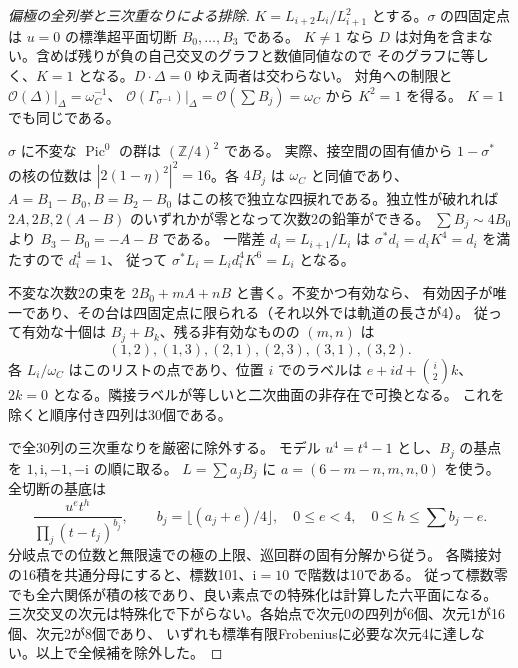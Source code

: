 \begin{proof}[偏極の全列挙と三次重なりによる排除]
$K=L_{i+2}L_i/L_{i+1}^2$ とする。$\sigma$ の四固定点は $u=0$ の標準超平面切断 $B_0,\ldots,B_3$ である。
$K\ne1$ なら $D$ は対角を含まない。含めば残りが負の自己交叉のグラフと数値同値なので
そのグラフに等しく、$K=1$ となる。$D\cdot\Delta=0$ ゆえ両者は交わらない。
対角への制限と $\mathcal O(\Delta)|_\Delta=\omega_C^{-1}$、
$\mathcal O(\Gamma_{\sigma^{-1}})|_\Delta=\mathcal O(\sum B_j)=\omega_C$ から $K^2=1$ を得る。
$K=1$ でも同じである。

$\sigma$ に不変な $\operatorname{Pic}^0$ の群は $(\mathbb Z/4)^2$ である。
実際、接空間の固有値から $1-\sigma^*$ の核の位数は
$|2(1-\eta)^2|^2=16$。各 $4B_j$ は $\omega_C$ と同値であり、
$A=B_1-B_0,B=B_2-B_0$ はこの核で独立な四捩れである。独立性が破れれば
$2A,2B,2(A-B)$ のいずれかが零となって次数2の鉛筆ができる。
$\sum B_j\sim4B_0$ より $B_3-B_0=-A-B$ である。
一階差 $d_i=L_{i+1}/L_i$ は $\sigma^*d_i=d_i K^4=d_i$ を満たすので $d_i^4=1$、
従って $\sigma^*L_i=L_i d_i^4 K^6=L_i$ となる。

不変な次数2の束を $2B_0+mA+nB$ と書く。不変かつ有効なら、
有効因子が唯一であり、その台は四固定点に限られる（それ以外では軌道の長さが4）。
従って有効な十個は $B_j+B_k$、残る非有効なものの $(m,n)$ は
\[
 (1,2),(1,3),(2,1),(2,3),(3,1),(3,2).
\]
各 $L_i/\omega_C$ はこのリストの点であり、位置 $i$ でのラベルは
$e+i d+\binom{i}{2}k$、$2k=0$ となる。隣接ラベルが等しいと二次曲面の非存在で可換となる。
これを除くと順序付き四列は30個である。

で全30列の三次重なりを厳密に除外する。
モデル $u^4=t^4-1$ とし、$B_j$ の基点を $1,\mathrm i,-1,-\mathrm i$ の順に取る。
$L=\sum a_j B_j$ に $a=(6-m-n,m,n,0)$ を使う。全切断の基底は
\[
 \frac{u^e t^h}{\prod_j(t-t_j)^{b_j}},\qquad
 b_j=\lfloor(a_j+e)/4\rfloor,\quad 0\le e<4,\quad 0\le h\le\sum b_j-e .
\]
分岐点での位数と無限遠での極の上限、巡回群の固有分解から従う。
各隣接対の16積を共通分母にすると、標数101、$\mathrm i=10$ で階数は10である。
従って標数零でも全六関係が積の核であり、良い素点での特殊化は計算した六平面になる。
三次交叉の次元は特殊化で下がらない。各始点で次元0の四列が6個、次元1が16個、次元2が8個であり、
いずれも標準有限Frobeniusに必要な次元4に達しない。以上で全候補を除外した。
\end{proof}
